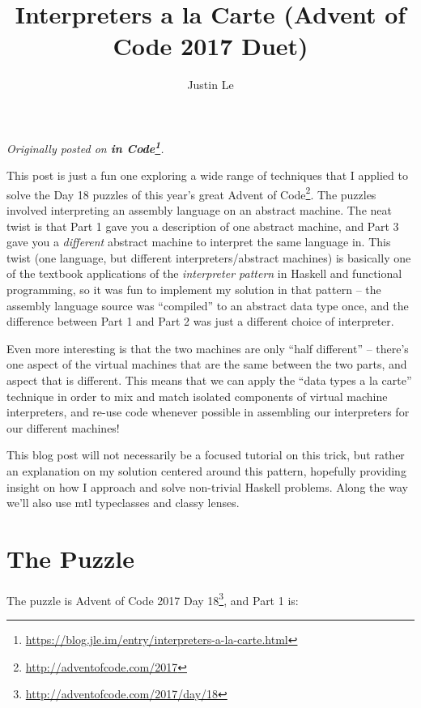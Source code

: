 \documentclass[]{article}
\title{Interpreters a la Carte (Advent of Code 2017 Duet)}
\author{Justin Le}
\renewcommand{\href}[2]{#2\footnote{\url{#1}}}
\begin{document}
\maketitle

\emph{Originally posted on
\textbf{\href{https://blog.jle.im/entry/interpreters-a-la-carte.html}{in
Code}}.}

This post is just a fun one exploring a wide range of techniques that I applied
to solve the Day 18 puzzles of this year's great
\href{http://adventofcode.com/2017}{Advent of Code}. The puzzles involved
interpreting an assembly language on an abstract machine. The neat twist is that
Part 1 gave you a description of one abstract machine, and Part 3 gave you a
\emph{different} abstract machine to interpret the same language in. This twist
(one language, but different interpreters/abstract machines) is basically one of
the textbook applications of the \emph{interpreter pattern} in Haskell and
functional programming, so it was fun to implement my solution in that pattern
-- the assembly language source was ``compiled'' to an abstract data type once,
and the difference between Part 1 and Part 2 was just a different choice of
interpreter.

Even more interesting is that the two machines are only ``half different'' --
there's one aspect of the virtual machines that are the same between the two
parts, and aspect that is different. This means that we can apply the ``data
types a la carte'' technique in order to mix and match isolated components of
virtual machine interpreters, and re-use code whenever possible in assembling
our interpreters for our different machines!

This blog post will not necessarily be a focused tutorial on this trick, but
rather an explanation on my solution centered around this pattern, hopefully
providing insight on how I approach and solve non-trivial Haskell problems.
Along the way we'll also use mtl typeclasses and classy lenses.

\section{The Puzzle}\label{the-puzzle}

The puzzle is \href{http://adventofcode.com/2017/day/18}{Advent of Code 2017 Day
18}, and Part 1 is:
\end{document}
